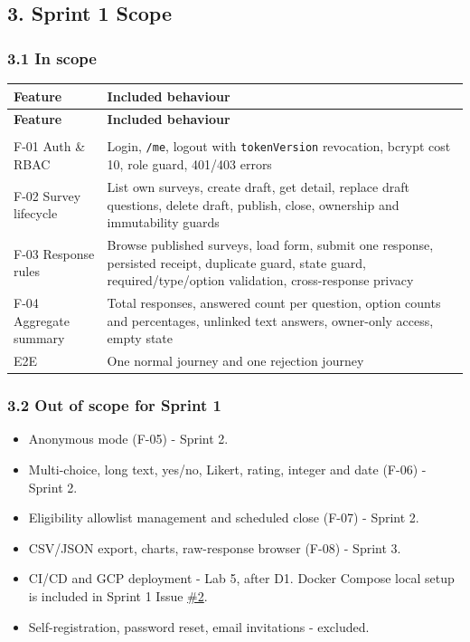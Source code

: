 \documentclass[12pt,a4paper]{article}
\begin{document}
\subsection*{3. Sprint 1 Scope}
\subsubsection*{3.1 In scope}
{\setlength{\tabcolsep}{3pt}\renewcommand{\arraystretch}{1.08}\small
\begin{longtable}{@{}>{\raggedright\arraybackslash}p{}>{\raggedright\arraybackslash}p{}@{}}
\toprule
\textbf{Feature} & \textbf{Included behaviour} \\
\midrule
\endfirsthead
\toprule
\textbf{Feature} & \textbf{Included behaviour} \\
\midrule
\endhead
\midrule
\multicolumn{2}{r}{\footnotesize\textit{Continued on next page}}\\
\endfoot
\bottomrule
\endlastfoot
F-01 Auth \& RBAC & Login, \texttt{/me}, logout with \texttt{tokenVersion} revocation, bcrypt cost 10, role guard, 401/403 errors \\
F-02 Survey lifecycle & List own surveys, create draft, get detail, replace draft questions, delete draft, publish, close, ownership and immutability guards \\
F-03 Response rules & Browse published surveys, load form, submit one response, persisted receipt, duplicate guard, state guard, required/type/option validation, cross-response privacy \\
F-04 Aggregate summary & Total responses, answered count per question, option counts and percentages, unlinked text answers, owner-only access, empty state \\
E2E & One normal journey and one rejection journey \\
\end{longtable}}

\subsubsection*{3.2 Out of scope for Sprint 1}
\begin{itemize}[leftmargin=*]
\item Anonymous mode (F-05) - Sprint 2.
\item Multi-choice, long text, yes/no, Likert, rating, integer and date (F-06) - Sprint 2.
\item Eligibility allowlist management and scheduled close (F-07) - Sprint 2.
\item CSV/JSON export, charts, raw-response browser (F-08) - Sprint 3.
\item CI/CD and GCP deployment - Lab 5, after D1. Docker Compose local setup is included in Sprint 1 Issue \href{https://github.com/Snnn3/SurveyHub/issues/2}{\#2}.
\item Self-registration, password reset, email invitations - excluded.
\end{itemize}
\end{document}
